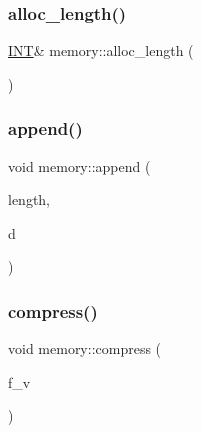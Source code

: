 \mbox{\label{classmemory_acaa1796a2f548d35cf87e03252b2184c}} 
\subsubsection{\texorpdfstring{alloc\+\_\+length()}{alloc\_length()}}
{\footnotesize\ttfamily \mbox{\hyperlink{galois_8h_a09fddde158a3a20bd2dcadb609de11dc}{I\+NT}}\& memory\+::alloc\+\_\+length (\begin{DoxyParamCaption}{ }\end{DoxyParamCaption})\hspace{0.3cm}{\ttfamily [inline]}}

\mbox{\label{classmemory_a2ad10d7a4707651f6b101d919f8402ed}} 
\subsubsection{\texorpdfstring{append()}{append()}}
{\footnotesize\ttfamily void memory\+::append (\begin{DoxyParamCaption}\item[{\mbox{\hyperlink{galois_8h_a09fddde158a3a20bd2dcadb609de11dc}{I\+NT}}}]{length,  }\item[{char $\ast$}]{d }\end{DoxyParamCaption})}

\mbox{\label{classmemory_afadcbb4b0b076d7f9552a9102b467683}} 
\subsubsection{\texorpdfstring{compress()}{compress()}}
{\footnotesize\ttfamily void memory\+::compress (\begin{DoxyParamCaption}\item[{\mbox{\hyperlink{galois_8h_a09fddde158a3a20bd2dcadb609de11dc}{I\+NT}}}]{f\+\_\+v }\end{DoxyParamCaption})}

\mbox{\label{classmemory_a4fe4349915769808c6ff3cf83c661bf0}} 
